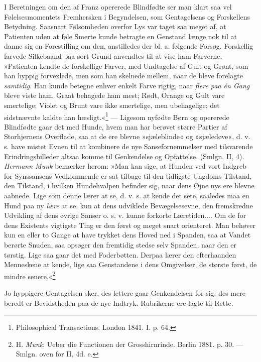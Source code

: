 \documentclass[12pt,a4paper,openany]{book}
\newcommand{\opage}[1]{\marginnote{\footnotesize\textit{[#1]}}}
\begin{document}
I Beretningen om den af Franz opererede Blindfødte ser man klart saa vel
Følelsesmomentets Fremhersken i Begyndelsen, som Gentagelsens og
Forskellens Betydning. Saasnart Følsomheden overfor Lys var taget saa
meget af, at Patienten uden at føle Smerte kunde betragte en Genstand
længe nok til at danne sig en Forestilling om den, anstilledes der bl.
a. følgende Forsøg. Forskellig farvede Silkebaand paa sort Grund
anvendtes til at vise ham Farverne. »Patienten kendte de forskellige
Farver, med Undtagelse af Gult og Grønt, som han hyppig forvexlede, men
som han skelnede mellem, naar de bleve forelagte \emph{samtidig}. Han
kunde betegne enhver enkelt Farve rigtig, naar \emph{flere paa én Gang}
bleve viste ham. Graat behagede ham mest; Rødt, Orange og Gult vare
smertelige; Violet og Brunt vare ikke smertelige, men ubehagelige; det
sidstnævnte kaldte han hæsligt.«\footnote[1]{Philosophical Transactions.
London 1841. I. p. 64.} --- Ligesom nyfødte Børn og opererede Blindfødte
gaar det med Hunde, hvem man har berøvet større Partier af Storhjernens
Overflade, saa at de ere blevne »sjæleblinde« og »sjæledøve«, d. v. s.
have mistet Evnen til
\opage{153}at kombinere de nye Sansefornemmelser med tilsvarende
Erindringsbilleder altsaa komme til Genkendelse og Opfattelse. (Smlgn.
II, 4). \emph{Hermann Munk} bemærker herom: »Man kan sige, at Hunden ved
vort Indgreb for Synssansens Vedkommende er sat tilbage til den
tidligste Ungdoms Tilstand, den Tilstand, i hvilken Hundehvalpen
befinder sig, naar dens Øjne nys ere blevne aabnede. Lige som denne
lærer at se, d. v. s. at kende det sete, saaledes maa en Hund paa ny
\emph{lære} at se, kun at dens udviklede Bevægelsesevne, den fremskredne
Udvikling af dens øvrige Sanser o. s. v. kunne forkorte Læretiden.... Om
de for dens Existents vigtigste Ting er den først og meget snart
orienteret. Man behøver kun en eller to Gange at have trykket dens Hoved
ned i Spanden, saa at Vandet berørte Snuden, saa opsøger den fremtidig
stedse selv Spanden, naar den er tørstig. Lige saa gaar det med
Foderbøtten. Derpaa lærer den efterhaanden Menneskene at kende, lige saa
Genstandene i dens Omgivelser, de største først, de mindre
senere.«\footnote[1]{H. \emph{Munk}: Ueber die Functionen der
Grosshirnrinde. Berlin 1881. p. 30. --- Smlgn. oven for II, 4d. e.}

Jo hyppigere Gentagelsen sker, des lettere gaar Genkendelsen for sig;
des mere beredt er Bevidstheden paa de nye Indtryk. Rubrikerne ere lagte
til Rette.
\end{document}
